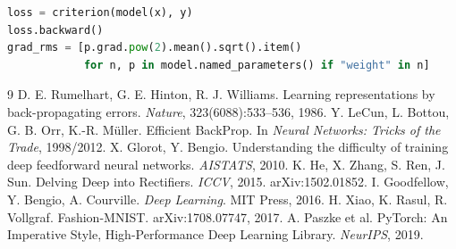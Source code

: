 \documentclass[12pt,a4paper]{article}
\begin{document}
\begin{lstlisting}[language=Python,caption={Tính gradient RMS tại khởi tạo (trích, \texttt{experiments/run\_deep\_demo.py})}]
loss = criterion(model(x), y)
loss.backward()
grad_rms = [p.grad.pow(2).mean().sqrt().item()
            for n, p in model.named_parameters() if "weight" in n]
\end{lstlisting}

\begin{thebibliography}{9}
 D. E. Rumelhart, G. E. Hinton, R. J. Williams. Learning representations by back-propagating errors. \emph{Nature}, 323(6088):533--536, 1986.
 Y. LeCun, L. Bottou, G. B. Orr, K.-R. Müller. Efficient BackProp. In \emph{Neural Networks: Tricks of the Trade}, 1998/2012.
 X. Glorot, Y. Bengio. Understanding the difficulty of training deep feedforward neural networks. \emph{AISTATS}, 2010.
 K. He, X. Zhang, S. Ren, J. Sun. Delving Deep into Rectifiers. \emph{ICCV}, 2015. arXiv:1502.01852.
 I. Goodfellow, Y. Bengio, A. Courville. \emph{Deep Learning}. MIT Press, 2016.
 H. Xiao, K. Rasul, R. Vollgraf. Fashion-MNIST. arXiv:1708.07747, 2017.
 A. Paszke et al. PyTorch: An Imperative Style, High-Performance Deep Learning Library. \emph{NeurIPS}, 2019.
\end{thebibliography}
\end{document}
